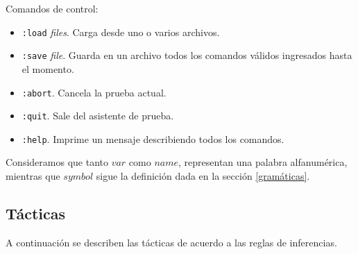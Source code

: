 \documentclass[a4paper,11pt]{article}
\theoremstyle{definition}
\theoremstyle{remark}
\begin{document}
Comandos de control: 

\begin{itemize}

\item \texttt{:load} \textit{files}. Carga desde uno o varios archivos.

\item \texttt{:save} \textit{file}. Guarda en un archivo todos los comandos válidos ingresados hasta el momento.

\item \texttt{:abort}. Cancela la prueba actual.

\item \texttt{:quit}. Sale del asistente de prueba.

\item \texttt{:help}. Imprime un mensaje describiendo todos los comandos.

\end{itemize}

Consideramos que tanto $var$ como $name$, representan una palabra alfanumérica, mientras
que $symbol$ sigue la definición dada en la sección \ref{gramáticas}. 

\subsection{Tácticas}
\label{tácticas}

A continuación se describen las tácticas de acuerdo a las reglas de inferencias.
\end{document}
